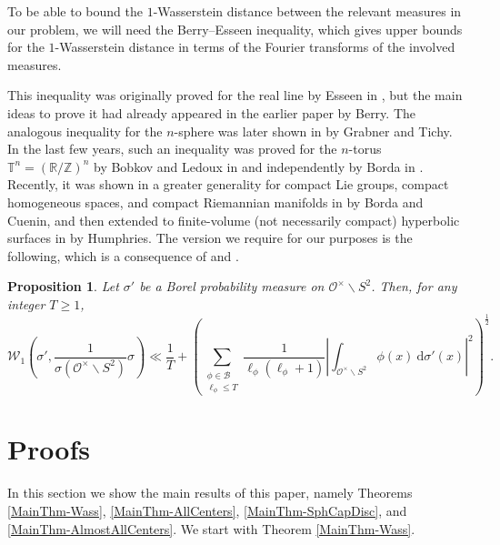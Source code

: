 \documentclass[11pt]{amsart}
\newtheorem{proposition}[theorem]{Proposition}
\theoremstyle{definition}
\begin{document}
To be able to bound the $1$-Wasserstein distance between the relevant measures in our problem, we will need the Berry--Esseen inequality, which gives upper bounds for the $1$-Wasserstein distance in terms of the Fourier transforms of the involved measures.

This inequality was originally proved for the real line by Esseen in \cite[Ch.~II, Thm.~2b]{Esseen-Wasserstein}, but the main ideas to prove it had already appeared in the earlier paper \cite{Berry-Wasserstein} by Berry. The analogous inequality for the $n$-sphere was later shown in \cite[Thm.~1]{GrabnerTichy-Wasserstein} by Grabner and Tichy. In the last few years, such an inequality was proved for the $n$-torus $\mathbb{T}^{n} = (\mathbb{R}/\mathbb{Z})^n$ by Bobkov and Ledoux in \cite[Prop.~2]{BobkovLedoux-Wasserstein} and independently by Borda in \cite[Prop.~3]{Borda-Wasserstein}. Recently, it was shown in a greater generality for compact Lie groups, compact homogeneous spaces, and compact Riemannian manifolds in \cite{BordaCuenin-Wasserstein} by Borda and Cuenin, and then extended to finite-volume (not necessarily compact) hyperbolic surfaces in \cite[Thms.~1.5, 1.10]{Humphries2025} by Humphries. The version we require for our purposes is the following, which is a consequence of \cite[Thm.~7]{BordaCuenin-Wasserstein} and \cite[Thm.~1]{GrabnerTichy-Wasserstein}.

\begin{proposition}\label{BerryEsseenSphere}
Let $\sigma'$ be a Borel probability measure on $\mathcal{O}^{\times} \backslash S^2$. Then, for any integer $T\geq 1$, $$ \mathscr{W}_{1}\left( \sigma', \frac{1}{\sigma(\mathcal{O}^{\times} \backslash S^2)} \sigma \right) \ll \frac{1}{T} + \left( \sum_{\substack{\phi \in \mathcal{B} \\ \ell_{\phi} \leq T }} \frac{1}{\ell_{\phi}(\ell_{\phi}+1)} \left| \int_{\mathcal{O}^{\times} \backslash S^2} \phi(x) \: \mathrm{d}\sigma'(x) \right|^{2} \right)^{\frac{1}{2}}. $$
\end{proposition}









\section{Proofs}\label{Proofs}

In this section we show the main results of this paper, namely Theorems \ref{MainThm-Wass}, \ref{MainThm-AllCenters}, \ref{MainThm-SphCapDisc}, and \ref{MainThm-AlmostAllCenters}. We start with Theorem \ref{MainThm-Wass}.
\end{document}

